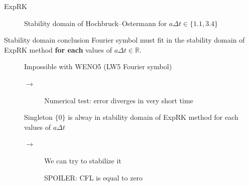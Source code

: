 \documentclass{beamer}
\newcommand{\cmark}{{\color{dgreen}\ding{51}}}%
\newcommand{\xmark}{{\color{red}\ding{55}}}%
\begin{document}
\begin{frame}{ExpRK}
{\begin{figure}
      \caption{Stability domain of Hochbruck--Ostermann for $a\Delta t\in\{1.1, 3.4\}$}
    \end{figure}
  }
\end{frame}

\begin{frame}{Stability domain conclusion}
Fourier symbol must fit in the stability domain of ExpRK method \textbf{for each} values of $a\Delta t\in\mathbb{R}$.
  \begin{description}
    \item[\xmark] Impossible with WENO5 (LW5 Fourier symbol) \begin{description}\item[$\rightarrow$] Numerical test: error diverges in very short time\end{description}
    \item[\cmark] Singleton $\{0\}$ is alway in stability domain of ExpRK method for each values of $a\Delta t$
      \begin{description}
        \item[$\rightarrow$] We can try to stabilize it
        \item[\xmark] SPOILER: CFL is equal to zero
      \end{description}
  \end{description}
\end{frame}
\end{document}
